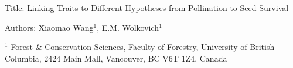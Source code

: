 \documentclass{article}
\begin{document}


\begin{center}
{\sc Title:} {Linking Traits to Different Hypotheses from Pollination to Seed Survival} \\
\vspace{5ex}

{\sc Authors:} Xiaomao Wang$^1$, E.M. Wolkovich$^1$
\end{center}



$^1$ Forest \& Conservation Sciences, Faculty of Forestry, University of British Columbia, 2424 Main Mall, Vancouver, BC V6T 1Z4, Canada\\
\end{document}
